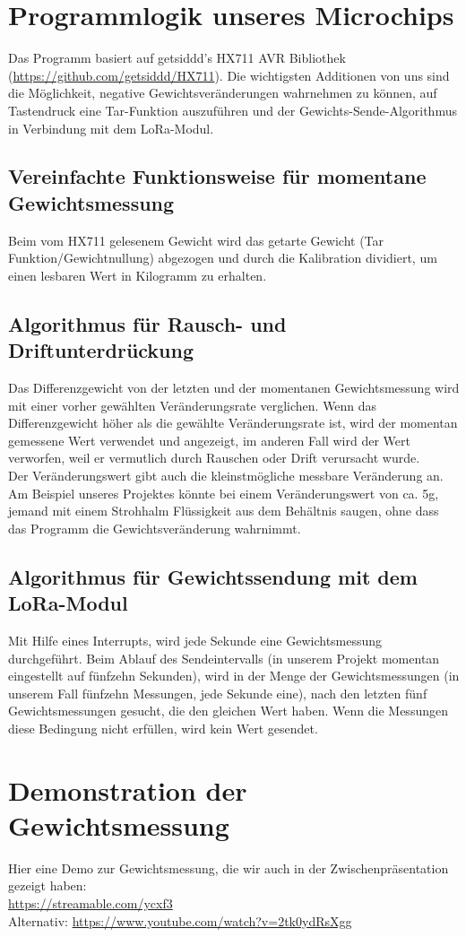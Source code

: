 \section{Programmlogik unseres Microchips}
Das Programm basiert auf getsiddd's HX711 AVR Bibliothek (\url{https://github.com/getsiddd/HX711}). Die wichtigsten Additionen von uns sind die Möglichkeit, negative Gewichtsveränderungen wahrnehmen zu können, auf Tastendruck eine Tar-Funktion auszuführen und der Gewichts-Sende-Algorithmus in Verbindung mit dem LoRa-Modul. 
\subsection{Vereinfachte Funktionsweise für momentane Gewichtsmessung}
Beim vom HX711 gelesenem Gewicht wird das getarte Gewicht (Tar Funktion/Gewichtnullung) abgezogen und durch die Kalibration dividiert, um einen lesbaren Wert in Kilogramm zu erhalten.
\subsection{Algorithmus für Rausch- und Driftunterdrückung}
Das Differenzgewicht von der letzten und der momentanen Gewichtsmessung wird mit einer vorher gewählten Veränderungsrate verglichen. Wenn das Differenzgewicht höher als die gewählte Veränderungsrate ist, wird der momentan gemessene Wert verwendet und angezeigt, im anderen Fall wird der Wert verworfen, weil er vermutlich durch Rauschen oder Drift verursacht wurde.\\
Der Veränderungswert gibt auch die kleinstmögliche messbare Veränderung an. Am Beispiel unseres Projektes könnte bei einem Veränderungswert von ca. 5g, jemand mit einem Strohhalm Flüssigkeit aus dem Behältnis saugen, ohne dass das Programm die Gewichtsveränderung wahrnimmt.
\subsection{Algorithmus für Gewichtssendung mit dem LoRa-Modul}
Mit Hilfe eines Interrupts, wird jede Sekunde eine Gewichtsmessung durchgeführt. Beim Ablauf des Sendeintervalls (in unserem Projekt momentan eingestellt auf fünfzehn Sekunden), wird in der Menge der Gewichtsmessungen (in unserem Fall fünfzehn Messungen, jede Sekunde eine), nach den letzten fünf Gewichtsmessungen gesucht, die den gleichen Wert haben. Wenn die Messungen diese Bedingung nicht erfüllen, wird kein Wert gesendet.

\section{Demonstration der Gewichtsmessung}
Hier eine Demo zur Gewichtsmessung, die wir auch in der Zwischenpräsentation gezeigt haben:\\
\url{https://streamable.com/ycxf3}\\
Alternativ: \url{https://www.youtube.com/watch?v=2tk0ydRsXgg}

